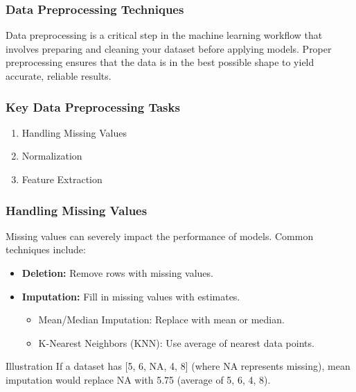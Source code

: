 \documentclass[aspectratio=169]{beamer}
\begin{document}
\begin{frame}[fragile]
  \frametitle{Data Preprocessing Techniques}
  Data preprocessing is a critical step in the machine learning workflow that involves preparing and cleaning your dataset before applying models. 
  Proper preprocessing ensures that the data is in the best possible shape to yield accurate, reliable results.
\end{frame}

\begin{frame}[fragile]
  \frametitle{Key Data Preprocessing Tasks}
  
  \begin{enumerate}
    \item Handling Missing Values
    \item Normalization
    \item Feature Extraction
  \end{enumerate}
\end{frame}

\begin{frame}[fragile]
  \frametitle{Handling Missing Values}

  Missing values can severely impact the performance of models. Common techniques include:

  \begin{itemize}
    \item \textbf{Deletion:} Remove rows with missing values.
    \item \textbf{Imputation:} Fill in missing values with estimates.
    \begin{itemize}
      \item Mean/Median Imputation: Replace with mean or median.
      \item K-Nearest Neighbors (KNN): Use average of nearest data points.
    \end{itemize}
  \end{itemize}

  \begin{block}{Illustration}
    If a dataset has [5, 6, NA, 4, 8] (where NA represents missing), 
    mean imputation would replace NA with 5.75 (average of 5, 6, 4, 8).
  \end{block}
\end{frame}
\end{document}

